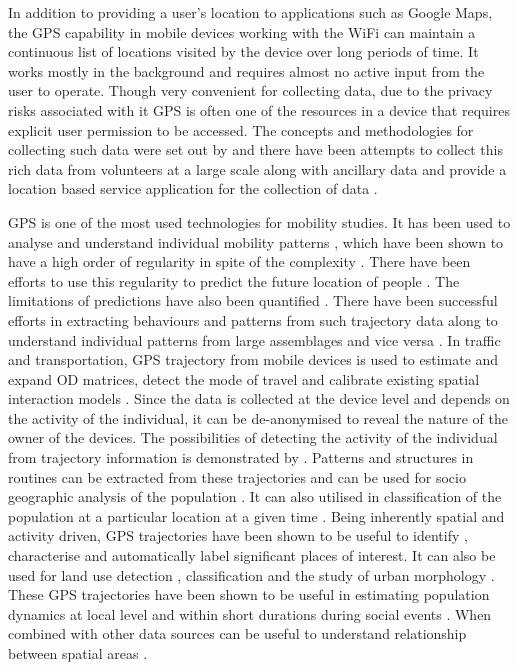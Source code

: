 In addition to providing a user’s location to applications such as Google Maps, the GPS capability in mobile devices working with the WiFi can maintain a continuous list of locations visited by the device over long periods of time.
It works mostly in the background and requires almost no active input from the user to operate.
Though very convenient for collecting data, due to the privacy risks associated with it GPS is often one of the resources in a device that requires explicit user permission to be accessed.
The concepts and methodologies for collecting such data were set out by \citep{asakura2004} and there have been attempts to collect this rich data from volunteers at a large scale along with ancillary data \citep{kiukkonen2010} and provide a location based service application for the collection of data \citep{ratti2006, jiang2006, ahas2005}.
 
GPS is one of the most used technologies for mobility studies.
It has been used to analyse and understand individual mobility patterns \citep{gonzalez2008, neuhaus2009}, which have been shown to have a high order of regularity in spite of the complexity \citep{brockmann2006, song2010a}.
There have been efforts to use this regularity to predict the future location of people \citep{monreale2009, calabrese2010}.
The limitations of predictions have also been quantified \citep{song2010}.
There have been successful efforts in extracting behaviours and patterns from such trajectory data \citep{liu2010, cho2011, hoteit2013, pappalardo2013} along to understand individual patterns from large assemblages \citep{giannotti2011, calabrese2013} and vice versa \citep{wirz2012}.
In traffic and transportation, GPS trajectory from mobile devices is used to estimate \citep{calabrese2011} and expand \citep{jing2011} OD matrices, detect the mode of travel \citep{gong2012, rossi2015} and calibrate existing spatial interaction models \citep{yue2012}
.
Since the data is collected at the device level and depends on the activity of the individual, it can be de-anonymised to reveal the nature of the owner of the devices.
The possibilities of detecting the activity of the individual from trajectory information is demonstrated by \citep{liao2006, krumm2007}.
Patterns \citep{jiang2012} and structures in routines \citep{eagle2009} can be extracted from these trajectories and can be used for socio geographic analysis of the population \citep{licoppe2008}.
It can also utilised in classification of the population at a particular location at a given time \citep{pappalardo2015}.
Being inherently spatial and activity driven, GPS trajectories have been shown to be useful to identify \citep{bao2012}, characterise \citep{wan2013} and automatically label \citep{do2014} significant places of interest.
It can also be used for land use detection \citep{toole2012}, classification \citep{jiang2015} and the study of urban morphology \citep{kang2012}.
These GPS trajectories have been shown to be useful in estimating population dynamics at local level and within short durations during social events \citep{calabrese2010, kim2014, deville2014}.
When combined with other data sources can be useful to understand relationship between spatial areas \citep{long2015}.

